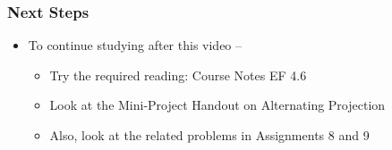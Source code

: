 \documentclass[10pt,english,aspectratio=169]{beamer}
\begin{document}
\begin{frame} \frametitle{Next Steps}

\begin{itemize}
\setlength\itemsep{5mm}
\item To continue studying after this video -- \vspace{2mm}

\begin{itemize}
 \setlength\itemsep{3mm}
 
 \item Try the required reading:  Course Notes EF 4.6
 
 \item Look at the Mini-Project Handout on Alternating Projection

 \item Also, look at the related problems in Assignments 8 and 9
\end{itemize}
\end{itemize}


\end{frame}
\end{document}
